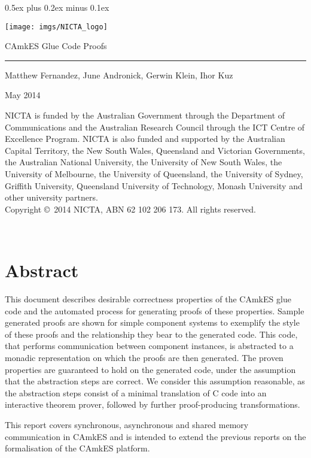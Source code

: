 \documentclass[11pt,a4paper]{scrreprt}
\date{\small\today}
\date{}
\newcommand{\camkes}{CAmkES\xspace}
\newcommand{\titl}{CAmkES Glue Code Proofs}
\newcommand{\authors}{Matthew Fernandez, June Andronick, Gerwin Klein, Ihor Kuz}
\newcommand{\nictafundingacknowledgement}{%
NICTA is funded by the Australian Government through the Department of Communications and the Australian Research Council through the ICT Centre of Excellence Program. NICTA is also funded and supported by the Australian Capital Territory, the New South Wales, Queensland and Victorian Governments, the Australian National University, the University of New South Wales, the University of Melbourne, the University of Queensland, the University of Sydney, Griffith University, Queensland University of Technology, Monash University and other university partners.}
\newcommand{\ABN}{ABN 62 102 206 173}
\newcommand{\cpright}{Copyright \copyright\ 2014 NICTA, \ABN.  All rights reserved.}
\newcommand{\bigdisclaimer}{%
\nictafundingacknowledgement\\

\cpright}
\newcommand{\pgstyle}{%
\fancyhf{}%
\renewcommand{\headrulewidth}{0pt}%
\fancyfoot[C]{}%
\fancyfoot[L]{}%
\fancyfoot[R]{\sl\thepage}}
\begin{document}
\parindent 0pt\parskip 0.5ex plus 0.2ex minus 0.1ex


\begin{center}
 \texttt{[image: imgs/NICTA\_logo]}
\end{center}
	
\vspace{14ex}
\textsf{\huge \titl}


\vspace{4ex}
\rule{0.85\textwidth}{5pt}
\vspace{4ex}
  
{\large \authors 

\vspace{2ex}
May 2014}

\vfill
{\small
\bigdisclaimer
}

\thispagestyle{empty}
\newpage
~
\restoregeometry

\fancypagestyle{empty}{\pgstyle}
\pagestyle{empty}


\cleardoublepage

\chapter*{Abstract}

This document describes desirable correctness properties of the \camkes glue
code and the automated process for generating proofs of these properties.
Sample generated proofs are shown for simple component systems to exemplify the
style of these proofs and the relationship they bear to the generated code.
This code, that performs communication between component instances, is
abstracted to a monadic representation on which the proofs are then generated.
The proven properties are guaranteed to hold on the generated code, under the
assumption that the abstraction steps are correct.
We consider this assumption reasonable, as the abstraction steps consist of a
minimal translation of C code into an interactive theorem prover, followed by further
proof-producing transformations.

This report covers synchronous, asynchronous and shared memory communication in
\camkes and is intended to extend the previous reports on the formalisation of
the \camkes platform.

\cleardoublepage
\tableofcontents







\end{document}
